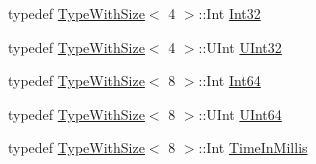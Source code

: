 \begin{DoxyCompactItemize}
\item 
typedef \hyperlink{classtesting_1_1internal_1_1_type_with_size}{Type\+With\+Size}$<$ 4 $>$\+::Int \hyperlink{namespacetesting_1_1internal_a8ee38faaf875f133358abaf9bc056cec}{Int32}
\item 
typedef \hyperlink{classtesting_1_1internal_1_1_type_with_size}{Type\+With\+Size}$<$ 4 $>$\+::U\+Int \hyperlink{namespacetesting_1_1internal_a40d4fffcd2bf56f18b1c380615aa85e3}{U\+Int32}
\item 
typedef \hyperlink{classtesting_1_1internal_1_1_type_with_size}{Type\+With\+Size}$<$ 8 $>$\+::Int \hyperlink{namespacetesting_1_1internal_a271c563fec38b804ddab0677f51f70a8}{Int64}
\item 
typedef \hyperlink{classtesting_1_1internal_1_1_type_with_size}{Type\+With\+Size}$<$ 8 $>$\+::U\+Int \hyperlink{namespacetesting_1_1internal_aa6a1ac454e6d7e550fa4925c62c35caa}{U\+Int64}
\item 
typedef \hyperlink{classtesting_1_1internal_1_1_type_with_size}{Type\+With\+Size}$<$ 8 $>$\+::Int \hyperlink{namespacetesting_1_1internal_a66a845df404b38fe85c5e14a069f255a}{Time\+In\+Millis}
\end{DoxyCompactItemize}
